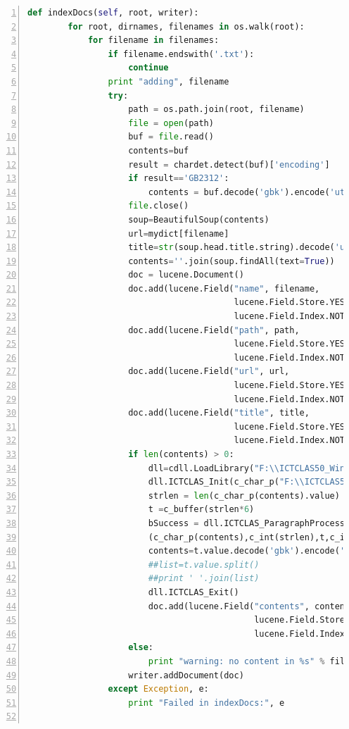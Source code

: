 \documentclass{article}
\begin{document}
\begin{lstlisting}[language=python,numbers=left,frame=leftline]
    def indexDocs(self, root, writer):
        for root, dirnames, filenames in os.walk(root):
            for filename in filenames:
                if filename.endswith('.txt'):
                    continue
                print "adding", filename
                try:
                    path = os.path.join(root, filename)
                    file = open(path)
                    buf = file.read()
                    contents=buf
                    result = chardet.detect(buf)['encoding']
                    if result=='GB2312':
                        contents = buf.decode('gbk').encode('utf8')
                    file.close()
                    soup=BeautifulSoup(contents)
                    url=mydict[filename]
                    title=str(soup.head.title.string).decode('utf8')
                    contents=''.join(soup.findAll(text=True))
                    doc = lucene.Document()
                    doc.add(lucene.Field("name", filename,
                                         lucene.Field.Store.YES,
                                         lucene.Field.Index.NOT_ANALYZED))
                    doc.add(lucene.Field("path", path,
                                         lucene.Field.Store.YES,
                                         lucene.Field.Index.NOT_ANALYZED))
                    doc.add(lucene.Field("url", url,
                                         lucene.Field.Store.YES,
                                         lucene.Field.Index.NOT_ANALYZED))
                    doc.add(lucene.Field("title", title,
                                         lucene.Field.Store.YES,
                                         lucene.Field.Index.NOT_ANALYZED))
                    if len(contents) > 0:
                        dll=cdll.LoadLibrary("F:\\ICTCLAS50_Windows_32_C\ICTCLAS50.dll")
                        dll.ICTCLAS_Init(c_char_p("F:\\ICTCLAS50_Windows_32_C"))
                        strlen = len(c_char_p(contents).value)
                        t =c_buffer(strlen*6)
                        bSuccess = dll.ICTCLAS_ParagraphProcess
                        (c_char_p(contents),c_int(strlen),t,c_int(0),0)
                        contents=t.value.decode('gbk').encode('utf8')
                        ##list=t.value.split()
                        ##print ' '.join(list)
                        dll.ICTCLAS_Exit()
                        doc.add(lucene.Field("contents", contents,
                                             lucene.Field.Store.NO,
                                             lucene.Field.Index.ANALYZED))
                    else:
                        print "warning: no content in %s" % filename
                    writer.addDocument(doc)
                except Exception, e:
                    print "Failed in indexDocs:", e


\end{lstlisting}
\end{document}
